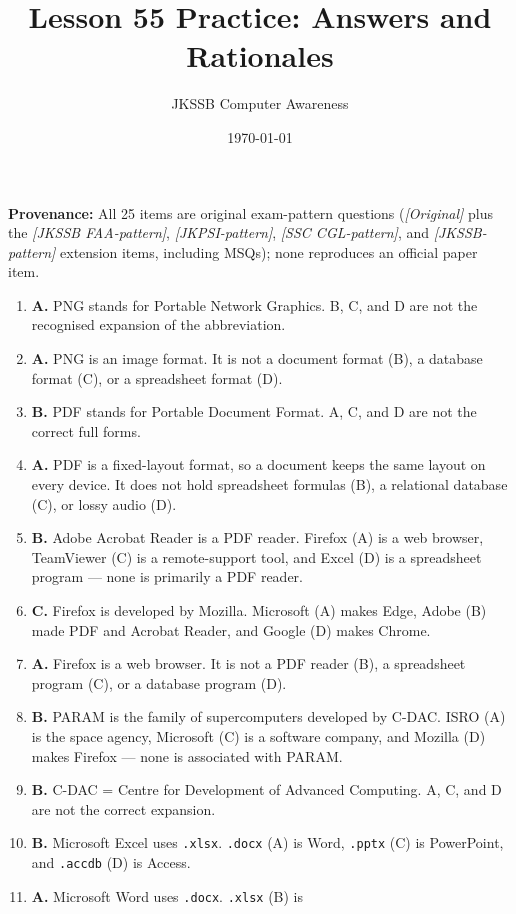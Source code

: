 \documentclass[11pt]{article}
\title{Lesson 55 Practice: Answers and Rationales}
\author{JKSSB Computer Awareness}
\date{\today}
\begin{document}
\maketitle
\noindent\textbf{Provenance:} All 25 items are original exam-pattern questions (\textit{[Original]} plus the \textit{[JKSSB FAA-pattern]}, \textit{[JKPSI-pattern]}, \textit{[SSC CGL-pattern]}, and \textit{[JKSSB-pattern]} extension items, including MSQs); none reproduces an official paper item.
\begin{enumerate}[label=\textbf{Q\arabic*.}, leftmargin=*]
\item \textbf{A.} PNG stands for Portable Network Graphics. B, C, and D are
  not the recognised expansion of the abbreviation.
\item \textbf{A.} PNG is an image format. It is not a document format (B), a
  database format (C), or a spreadsheet format (D).
\item \textbf{B.} PDF stands for Portable Document Format. A, C, and D are
  not the correct full forms.
\item \textbf{A.} PDF is a fixed-layout format, so a document keeps the same
  layout on every device. It does not hold spreadsheet formulas (B), a
  relational database (C), or lossy audio (D).
\item \textbf{B.} Adobe Acrobat Reader is a PDF reader. Firefox (A) is a web
  browser, TeamViewer (C) is a remote-support tool, and Excel (D) is a
  spreadsheet program --- none is primarily a PDF reader.
\item \textbf{C.} Firefox is developed by Mozilla. Microsoft (A) makes Edge,
  Adobe (B) made PDF and Acrobat Reader, and Google (D) makes Chrome.
\item \textbf{A.} Firefox is a web browser. It is not a PDF reader (B), a
  spreadsheet program (C), or a database program (D).
\item \textbf{B.} PARAM is the family of supercomputers developed by C-DAC.
  ISRO (A) is the space agency, Microsoft (C) is a software company, and
  Mozilla (D) makes Firefox --- none is associated with PARAM.
\item \textbf{B.} C-DAC = Centre for Development of Advanced Computing. A, C,
  and D are not the correct expansion.
\item \textbf{B.} Microsoft Excel uses \texttt{.xlsx}. \texttt{.docx} (A) is
  Word, \texttt{.pptx} (C) is PowerPoint, and \texttt{.accdb} (D) is Access.
\item \textbf{A.} Microsoft Word uses \texttt{.docx}. \texttt{.xlsx} (B) is

\end{enumerate}
\end{document}
